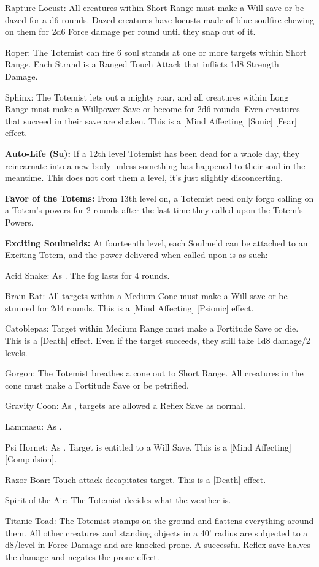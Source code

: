 \begin{description*}
\item[Rapture Locust:] All creatures within Short Range must make a Will save or be dazed for a d6 rounds. Dazed creatures have locusts made of blue soulfire chewing on them for 2d6 Force damage per round until they snap out of it.
\item[Roper:] The Totemist can fire 6 soul strands at one or more targets within Short Range. Each Strand is a Ranged Touch Attack that inflicts 1d8 Strength Damage.
\item[Sphinx:] The Totemist lets out a mighty roar, and all creatures within Long Range must make a Willpower Save or become  for 2d6 rounds. Even creatures that succeed in their save are shaken. This is a [Mind Affecting] [Sonic] [Fear] effect.
\end{description*}

\textbf{Auto-Life (Su):} If a 12th level Totemist has been dead for a whole day, they reincarnate into a new body unless something has happened to their soul in the meantime. This does not cost them a level, it's just slightly disconcerting.

\textbf{Favor of the Totems:} From 13th level on, a Totemist need only forgo calling on a Totem's powers for 2 rounds after the last time they called upon the Totem's Powers.

\textbf{Exciting Soulmelds:} At fourteenth level, each Soulmeld can be attached to an Exciting Totem, and the power delivered when called upon is as such:
\begin{description*}
\item[Acid Snake:] As . The fog lasts for 4 rounds.
\item[Brain Rat:] All targets within a Medium Cone must make a Will save or be stunned for 2d4 rounds. This is a [Mind Affecting] [Psionic] effect.
\item[Catoblepas:] Target within Medium Range must make a Fortitude Save or die. This is a [Death] effect. Even if the target succeeds, they still take 1d8 damage/2 levels.
\item[Gorgon:] The Totemist breathes a cone out to Short Range. All creatures in the cone must make a Fortitude Save or be petrified.
\item[Gravity Coon:] As , targets are allowed a Reflex Save as normal.
\item[Lammasu:] As .
\item[Psi Hornet:] As . Target is entitled to a Will Save. This is a [Mind Affecting] [Compulsion].
\item[Razor Boar:] Touch attack decapitates target. This is a [Death] effect.
\item[Spirit of the Air:] The Totemist decides what the weather is.
\item[Titanic Toad:] The Totemist stamps on the ground and flattens everything around them. All other creatures and standing objects in a 40' radius are subjected to a d8/level in Force Damage and are knocked prone. A successful Reflex save halves the damage and negates the prone effect.
\end{description*}

